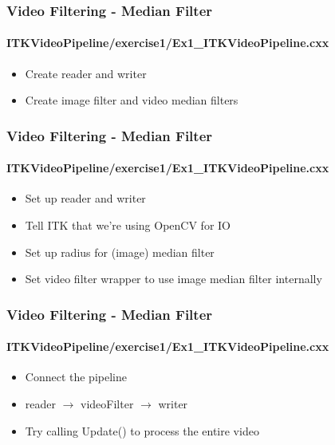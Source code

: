 {
\begin{frame}[fragile]
\frametitle{Video Filtering - Median Filter}
\framesubtitle{ITKVideoPipeline/exercise1/Ex1\_ITKVideoPipeline.cxx}
\begin{itemize}
\item Create reader and writer
\pause

\item Create image filter and video median filters
\end{itemize}
\end{frame}
}

{
\begin{frame}[fragile]
\frametitle{Video Filtering - Median Filter}
\framesubtitle{ITKVideoPipeline/exercise1/Ex1\_ITKVideoPipeline.cxx}
\begin{itemize}
\item Set up reader and writer
\item Tell ITK that we're using OpenCV for IO
\pause

\item Set up radius for (image) median filter
\item Set video filter wrapper to use image median filter internally
\end{itemize}
\end{frame}
}

{
\begin{frame}[fragile]
\frametitle{Video Filtering - Median Filter}
\framesubtitle{ITKVideoPipeline/exercise1/Ex1\_ITKVideoPipeline.cxx}
\begin{itemize}
\item Connect the pipeline
\item reader $\rightarrow$ videoFilter $\rightarrow$ writer
\pause

\item Try calling Update() to process the entire video
\end{itemize}
\end{frame}
}


